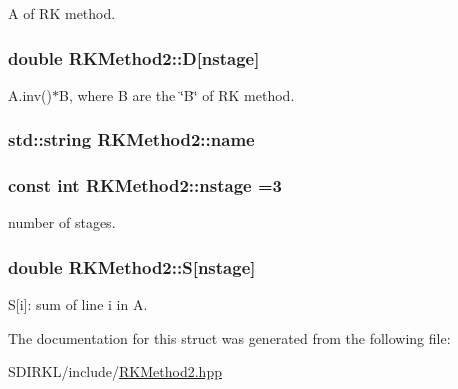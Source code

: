 A of R\-K method. 

\hypertarget{structRKMethod2_a011951cc287f7df3cb76f8827217e0d5}{
\subsubsection[{D}]{\setlength{\rightskip}{0pt plus 5cm}double R\-K\-Method2\-::\-D\mbox{[}{\bf nstage}\mbox{]}}}\label{structRKMethod2_a011951cc287f7df3cb76f8827217e0d5}


A.\-inv()$\ast$\-B, where B are the \char`\"{}\-B\char`\"{} of R\-K method. 

\hypertarget{structRKMethod2_a804f6222e9e48ba6a8ec4b1f4ecf39ea}{
\subsubsection[{name}]{\setlength{\rightskip}{0pt plus 5cm}std\-::string R\-K\-Method2\-::name}}\label{structRKMethod2_a804f6222e9e48ba6a8ec4b1f4ecf39ea}
\hypertarget{structRKMethod2_ac7659bcba97246c2f9912d86655fc08f}{
\subsubsection[{nstage}]{\setlength{\rightskip}{0pt plus 5cm}const int R\-K\-Method2\-::nstage =3\hspace{0.3cm}{\ttfamily [static]}}}\label{structRKMethod2_ac7659bcba97246c2f9912d86655fc08f}


number of stages. 

\hypertarget{structRKMethod2_a90c9315231c3a7e4273989ef795cd42f}{
\subsubsection[{S}]{\setlength{\rightskip}{0pt plus 5cm}double R\-K\-Method2\-::\-S\mbox{[}{\bf nstage}\mbox{]}}}\label{structRKMethod2_a90c9315231c3a7e4273989ef795cd42f}


S\mbox{[}i\mbox{]}\-: sum of line i in A. 



The documentation for this struct was generated from the following file\-:\begin{DoxyCompactItemize}
\item 
S\-D\-I\-R\-K\-L/include/\hyperlink{RKMethod2_8hpp}{R\-K\-Method2.\-hpp}\end{DoxyCompactItemize}
